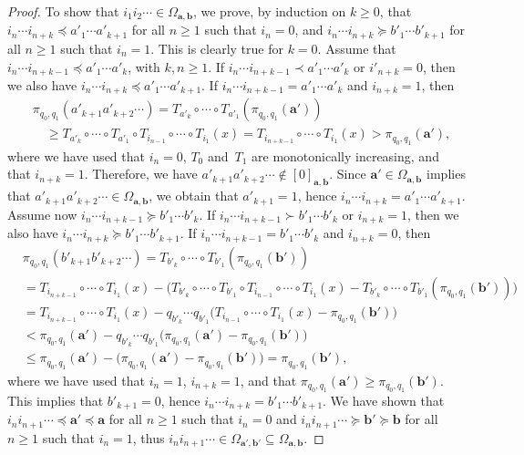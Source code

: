 \documentclass{amsart}
\theoremstyle{definition}
\numberwithin{equation}{section}
\newcommand{\ba}{\mathbf{a}}
\newcommand{\bb}{\mathbf{b}}
\begin{document}
\begin{proof}
To show that $i_1i_2\cdots \in \Omega_{\ba,\bb}$, we prove, by induction on $k \ge 0$, that $i_n \cdots i_{n+k} \preceq a'_1 \cdots a'_{k+1}$ for all $n \ge 1$ such that $i_n = 0$, and $i_n \cdots i_{n+k} \succeq b'_1 \cdots b'_{k+1}$ for all $n \ge 1$ such that $i_n = 1$.
This is clearly true for $k = 0$.
Assume that $i_n \cdots i_{n+{k-1}} \preceq a'_1 \cdots a'_k$, with $k,n \ge 1$.
If $i_n \cdots i_{n+{k-1}} \prec a'_1 \cdots a'_k$ or $i'_{n+k} = 0$, then we also have $i_n \cdots i_{n+k} \preceq a'_1 \cdots a'_{k+1}$.
If $i_n \cdots i_{n+k-1} = a'_1 \cdots a'_k$ and $i_{n+k} = 1$, then
\[
\begin{aligned}
& \pi_{q_0,q_1}(a'_{k+1}a'_{k+2}\cdots) = T_{a'_k} \circ \cdots \circ T_{a'_1}(\pi_{q_0,q_1}(\ba')) \\
& \quad \ge T_{a'_k} \circ \cdots \circ T_{a'_1} \circ T_{i_{n-1}} \circ \cdots \circ T_{i_1}(x) = T_{i_{n+k-1}} \circ \cdots \circ T_{i_1}(x) > \pi_{q_0,q_1}(\ba'),
\end{aligned}
\]
where we have used that $i_n = 0$, $T_0$ and~$T_1$ are monotonically increasing, and that $i_{n+k} = 1$.
Therefore, we have $a'_{k+1}a'_{k+2}\cdots \notin [0]_{\ba,\bb}$. 
Since $\ba' \in \Omega_{\ba,\bb}$ implies that $a'_{k+1}a'_{k+2}\cdots \in \Omega_{\ba,\bb}$, we obtain that $a'_{k+1} = 1$, hence $i_n \cdots i_{n+k} = a'_1 \cdots a'_{k+1}$.
Assume now $i_n \cdots i_{n+{k-1}} \succeq b'_1 \cdots b'_k$. 
If $i_n \cdots i_{n+{k-1}} \succ b'_1 \cdots b'_k$ or $i_{n+k} = 1$, then we also have $i_n \cdots i_{n+k} \succeq b'_1 \cdots b'_{k+1}$.
If $i_n \cdots i_{n+k-1} = b'_1 \cdots b'_k$ and $i_{n+k} = 0$, then
\[
\begin{aligned}
& \pi_{q_0,q_1}(b'_{k+1}b'_{k+2}\cdots) = T_{b'_k} \circ \cdots \circ T_{b'_1}(\pi_{q_0,q_1}(\bb')) \\
& = T_{i_{n+k-1}} {\circ} \cdots {\circ} T_{i_1}(x) - \big(T_{b'_k} {\circ} \cdots {\circ} T_{b'_1} {\circ} T_{i_{n-1}} {\circ} \cdots {\circ} T_{i_1}(x) {-} T_{b'_k} {\circ} \cdots {\circ} T_{b'_1}(\pi_{q_0,q_1}(\bb'))\big) \\
& = T_{i_{n+k-1}} \circ \cdots \circ T_{i_1}(x) - q_{b'_k} \cdots q_{b'_1} \big(T_{i_{n-1}} \circ \cdots \circ T_{i_1}(x) - \pi_{q_0,q_1}(\bb')\big) \\ 
& < \pi_{q_0,q_1}(\ba') - q_{b'_k} \cdots q_{b'_1} \big(\pi_{q_0,q_1}(\ba') - \pi_{q_0,q_1}(\bb')\big) \\
& \le \pi_{q_0,q_1}(\ba') - \big(\pi_{q_0,q_1}(\ba') - \pi_{q_0,q_1}(\bb')\big) = \pi_{q_0,q_1}(\bb'),
\end{aligned}
\]
where we have used that $i_n = 1$, $i_{n+k} = 1$, and that $\pi_{q_0,q_1}(\ba') \ge \pi_{q_0,q_1}(\bb')$.
This implies that $b'_{k+1} = 0$, hence $i_n \cdots i_{n+k} = b'_1 \cdots b'_{k+1}$.
We have shown that $i_ni_{n+1}\cdots \preceq \ba' \preceq \ba$ for all $n \ge 1$ such that $i_n = 0$ and $i_ni_{n+1}\cdots \succeq \bb' \succeq \bb$ for all $n \ge 1$ such that $i_n = 1$, thus $i_ni_{n+1}\cdots \in \Omega_{\ba',\bb'} \subseteq \Omega_{\ba,\bb}$. 
\end{proof}
\end{document}
